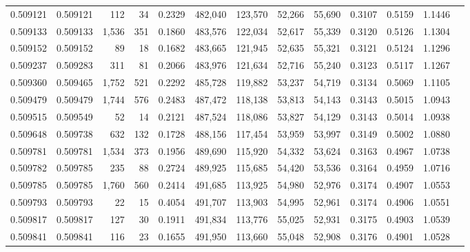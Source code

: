 \begin{tabular}{rrrrrrrrrrrrr}
0.509121 & 0.509121 &   112 &    34 &                                     0.2329 & 482,040 & 123,570 &  52,266 &  55,690 & 0.3107 & 0.5159 & 1.1446 \\
0.509133 & 0.509133 & 1,536 &   351 &                                     0.1860 & 483,576 & 122,034 &  52,617 &  55,339 & 0.3120 & 0.5126 & 1.1304 \\
0.509152 & 0.509152 &    89 &    18 &                                     0.1682 & 483,665 & 121,945 &  52,635 &  55,321 & 0.3121 & 0.5124 & 1.1296 \\
0.509237 & 0.509283 &   311 &    81 &                                     0.2066 & 483,976 & 121,634 &  52,716 &  55,240 & 0.3123 & 0.5117 & 1.1267 \\
0.509360 & 0.509465 & 1,752 &   521 &                                     0.2292 & 485,728 & 119,882 &  53,237 &  54,719 & 0.3134 & 0.5069 & 1.1105 \\
0.509479 & 0.509479 & 1,744 &   576 &                                     0.2483 & 487,472 & 118,138 &  53,813 &  54,143 & 0.3143 & 0.5015 & 1.0943 \\
0.509515 & 0.509549 &    52 &    14 &                                     0.2121 & 487,524 & 118,086 &  53,827 &  54,129 & 0.3143 & 0.5014 & 1.0938 \\
0.509648 & 0.509738 &   632 &   132 &                                     0.1728 & 488,156 & 117,454 &  53,959 &  53,997 & 0.3149 & 0.5002 & 1.0880 \\
0.509781 & 0.509781 & 1,534 &   373 &                                     0.1956 & 489,690 & 115,920 &  54,332 &  53,624 & 0.3163 & 0.4967 & 1.0738 \\
0.509782 & 0.509785 &   235 &    88 &                                     0.2724 & 489,925 & 115,685 &  54,420 &  53,536 & 0.3164 & 0.4959 & 1.0716 \\
0.509785 & 0.509785 & 1,760 &   560 &                                     0.2414 & 491,685 & 113,925 &  54,980 &  52,976 & 0.3174 & 0.4907 & 1.0553 \\
0.509793 & 0.509793 &    22 &    15 &                                     0.4054 & 491,707 & 113,903 &  54,995 &  52,961 & 0.3174 & 0.4906 & 1.0551 \\
0.509817 & 0.509817 &   127 &    30 &                                     0.1911 & 491,834 & 113,776 &  55,025 &  52,931 & 0.3175 & 0.4903 & 1.0539 \\
0.509841 & 0.509841 &   116 &    23 &                                     0.1655 & 491,950 & 113,660 &  55,048 &  52,908 & 0.3176 & 0.4901 & 1.0528 \\

\end{tabular}
